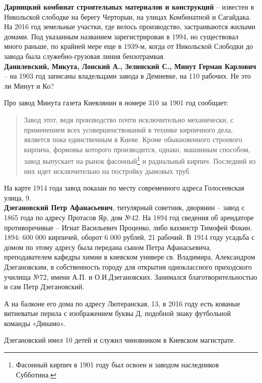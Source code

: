 \noindent\textbf{Дарницкий комбинат строительных материалов и конструкций} – известен в Никольской слободке на берегу Черторыи, на улицах Комбинатной и Сагайдака. На 2016 год земельные участки, где велось производство, застраиваются жилыми домами. Под указанным названием зарегистрирован в 1994, но существовал много раньше, по крайней мере еще в 1939-м, когда от Никольской Слободки до завода была служебно-грузовая линия бензотрамвая.\\

\noindent\textbf{Данилевский, Микута, Лонский А., Зелинский С., Минут Герман Карлович} – на 1903 год записаны владельцами завода в Демиевке, на 110 рабочих. Не это ли Минут и Ко?

Про завод Минута газета Киевлянин в номере 310 за 1901 год сообщает: 

\begin{quotation}
Завод этот, ведя производство почти исключительно механически, с применением всех усовершенствований в технике кирпичного дела, является пока единственным в Киеве. Кроме обыкновенного строевого кирпича, формовка которого производится, однако, машинным способом, завод выпускает на рынок фасонный\footnote{Фасонный кирпич в 1901 году был освоен и заводом наследников Субботина.} и радиальный кирпич. Последний из них идет исключительно на постройку дымовых труб.\end{quotation}

На карте 1914 года завод показан по месту современного адреса Голосеевская улица, 9.\\

\noindent\textbf{Дзегановский Петр Афанасьевич}, титулярный советник, дворянин – завод с 1865 года по адресу Протасов Яр, дом №42. На 1894 год сведения об арендаторе противоречивые – Игнат Васильевич Проценко, либо вахмистр Тимофей Фокин. 1894: 600 000 кирпичей, оборот 6 000 рублей, 21 рабочий. В 1914 году усадьба с домом по этому адресу была передана сыном Петра Афанасьевича, преподавателем кафедры химии в киевском универе св. Владимира, Александром Дзегановским, в собственность городу для открытия одноклассного приходского училища №72, имени А.П. и О.И.Дзегановских. Занимался благотворительностью и сам Петр Дзегановский.

А на балконе его дома по адресу Лютеранская, 13, в 2016 году есть кованые витиеватые перила с изображением буквы Д, подобной знаку футбольной команды «Динамо».

Дзегановский имел 10 детей и служил чиновником в Киевском магистрате.\\

